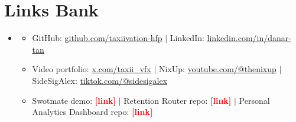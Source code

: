 \documentclass[letterpaper,11pt]{article}
\newcommand{\resumeItem}[1]{\item\small{{#1 \vspace{-2pt}}}}
\newcommand{\tbd}[1]{\textcolor{red}{\textbf{[#1]}}}
\newcommand{\resumeSubHeadingListStart}{\begin{itemize}[leftmargin=0.15in, label={}]}
\newcommand{\resumeSubHeadingListEnd}{\end{itemize}}
\newcommand{\resumeItemListStart}{\begin{itemize}}
\newcommand{\resumeItemListEnd}{\end{itemize}\vspace{-5pt}}
\begin{document}
\section{Links Bank}
  \resumeSubHeadingListStart
    \item[]
    \resumeItemListStart
      \resumeItem{GitHub: \href{https://github.com/taxiivation-hfp}{\underline{github.com/taxiivation-hfp}} $|$ LinkedIn: \href{https://linkedin.com/in/danar-tan}{\underline{linkedin.com/in/danar-tan}}}
      \resumeItem{Video portfolio: \href{http://x.com/taxii_vfx/all}{\underline{x.com/taxii\_vfx}} $|$ NixUp: \href{https://www.youtube.com/@thenixup}{\underline{youtube.com/@thenixup}} $|$ SideSigAlex: \href{https://www.tiktok.com/@sidesigalex}{\underline{tiktok.com/@sidesigalex}}}
      \resumeItem{Swotmate demo: \tbd{link} $|$ Retention Router repo: \tbd{link} $|$ Personal Analytics Dashboard repo: \tbd{link}}
    \resumeItemListEnd
  \resumeSubHeadingListEnd
\end{document}
